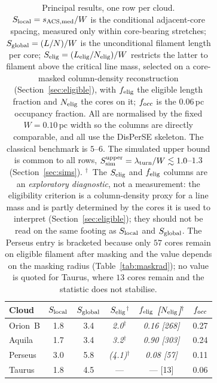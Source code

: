 \documentclass[usenatbib,twoside,twocolumn]{mnras}
\begin{document}
\begin{table}
\caption{Principal results, one row per cloud. $S_{\rm local}=s_{\rm ACS,med}/W$ is the conditional adjacent-core spacing, measured only within core-bearing stretches; $S_{\rm global}=(L/N)/W$ is the unconditional filament length per core; $S_{\rm elig}=(L_{\rm elig}/N_{\rm elig})/W$ restricts the latter to filament above the critical line mass, selected on a core-masked column-density reconstruction (Section~\ref{sec:eligible}), with $f_{\rm elig}$ the eligible length fraction and $N_{\rm elig}$ the cores on it; $f_{\rm occ}$ is the $0.06$\,pc occupancy fraction. All are normalised by the fixed $W=0.10$\,pc width so the columns are directly comparable, and all use the DisPerSE skeleton. The classical benchmark is $5$--$6$. The simulated upper bound is common to all rows, $S_{\rm sim}^{\rm upper}=\lambda_{\rm turn}/W\lesssim1.0$--$1.3$ (Section~\ref{sec:sims}). $^{\dagger}$~The $S_{\rm elig}$ and $f_{\rm elig}$ columns are an \emph{exploratory diagnostic}, not a measurement: the eligibility criterion is a column-density proxy for a line mass and is partly determined by the cores it is used to interpret (Section~\ref{sec:eligible}); they should not be read on the same footing as $S_{\rm local}$ and $S_{\rm global}$. The Perseus entry is bracketed because only $57$ cores remain on eligible filament after masking and the value depends on the masking radius (Table~\ref{tab:maskrad}); no value is quoted for Taurus, where $13$ cores remain and the statistic does not stabilise.}
\label{tab:principal}
\footnotesize
\setlength{\tabcolsep}{4pt}
\begin{tabular}{lccccc}
\toprule
Cloud & $S_{\rm local}$ & $S_{\rm global}$ & \emph{$S_{\rm elig}$}$^{\dagger}$ & \emph{$f_{\rm elig}$ [$N_{\rm elig}$]}$^{\dagger}$ & $f_{\rm occ}$ \\
\midrule
Orion~B & 1.8 & 3.4 & \emph{2.0}$^{\dagger}$ & \emph{0.16 [268]} & 0.27 \\
Aquila  & 1.7 & 3.4 & \emph{3.2}$^{\dagger}$ & \emph{0.90 [303]} & 0.24 \\
Perseus & 3.0 & 5.8 & \emph{(4.1)}$^{\dagger}$ & \emph{0.08 [57]} & 0.11 \\
Taurus  & 1.8 & 4.5 & ---    & --- [13]   & 0.06 \\
\bottomrule
\end{tabular}
\end{table}
\end{document}
